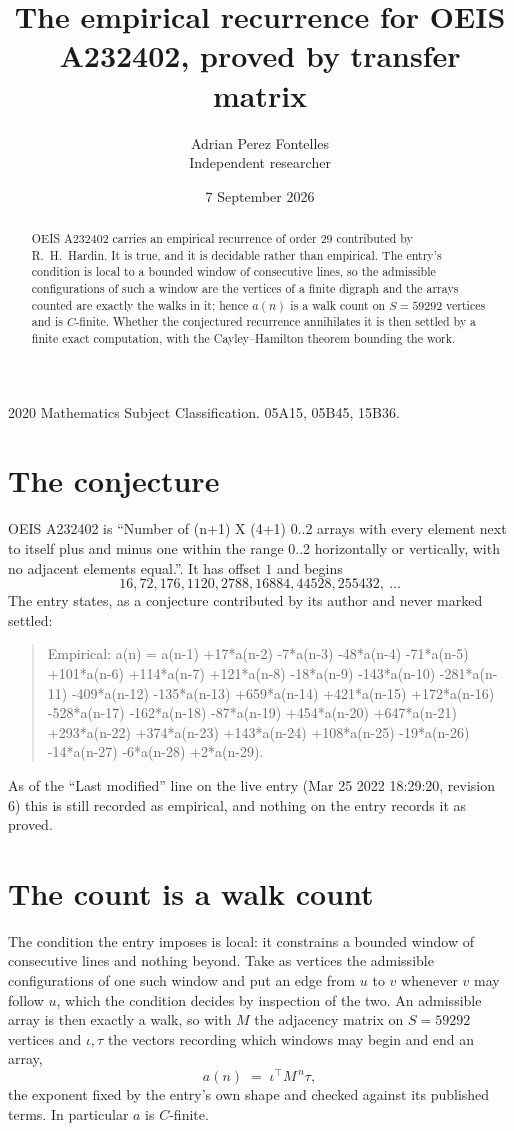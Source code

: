 \documentclass[11pt,a4paper]{article}
\title{The empirical recurrence for OEIS A232402, proved by transfer matrix}
\author{Adrian Perez Fontelles\\ \small Independent researcher}
\date{7 September 2026}
\theoremstyle{plain}
\theoremstyle{definition}
\begin{document}
\maketitle

\begin{abstract}
OEIS A232402 carries an empirical recurrence of order $29$ contributed by R.~H.~Hardin. It is
true, and it is decidable rather than empirical. The entry's condition is local to a bounded window of consecutive lines, so
the admissible configurations of such a window are the vertices of a finite digraph and the
arrays counted are exactly the walks in it; hence $a(n)$ is a walk count on $S=59292$ vertices
and is $C$-finite. Whether the conjectured recurrence annihilates it is then settled by a
finite exact computation, with the Cayley--Hamilton theorem bounding the work.
\end{abstract}

\noindent\small 2020 Mathematics Subject Classification. 05A15, 05B45, 15B36.\normalsize

\section{The conjecture}

OEIS A232402 is ``Number of (n+1) X (4+1) 0..2 arrays with every element next to itself plus and minus one within the range 0..2 horizontally or vertically, with no adjacent elements equal.''. It has offset $1$ and begins
\[
16, 72, 176, 1120, 2788, 16884, 44528, 255432,\ \dots
\]
The entry states, as a conjecture contributed by its author and never marked settled:
\begin{quote}
Empirical: a(n) = a(n-1) +17*a(n-2) -7*a(n-3) -48*a(n-4) -71*a(n-5) +101*a(n-6) +114*a(n-7) +121*a(n-8) -18*a(n-9) -143*a(n-10) -281*a(n-11) -409*a(n-12) -135*a(n-13) +659*a(n-14) +421*a(n-15) +172*a(n-16) -528*a(n-17) -162*a(n-18) -87*a(n-19) +454*a(n-20) +647*a(n-21) +293*a(n-22) +374*a(n-23) +143*a(n-24) +108*a(n-25) -19*a(n-26) -14*a(n-27) -6*a(n-28) +2*a(n-29).
\end{quote}
As of the ``Last modified'' line on the live entry (Mar 25 2022 18:29:20, revision 6) this is still
recorded as empirical, and nothing on the entry records it as proved.

\section{The count is a walk count}

The condition the entry imposes is local: it constrains a bounded window of consecutive lines and nothing beyond. Take as
vertices the admissible configurations of one such window and put an edge from $u$ to $v$
whenever $v$ may follow $u$, which the condition decides by inspection of the two. An
admissible array is then exactly a walk, so with $M$ the adjacency matrix on $S=59292$ vertices
and $\iota,\tau$ the vectors recording which windows may begin and end an array,
\[
a(n)\;=\;\iota^{\!\top}M^{\,n}\tau ,
\]
the exponent fixed by the entry's own shape and checked against its published terms. In
particular $a$ is $C$-finite.
\end{document}
